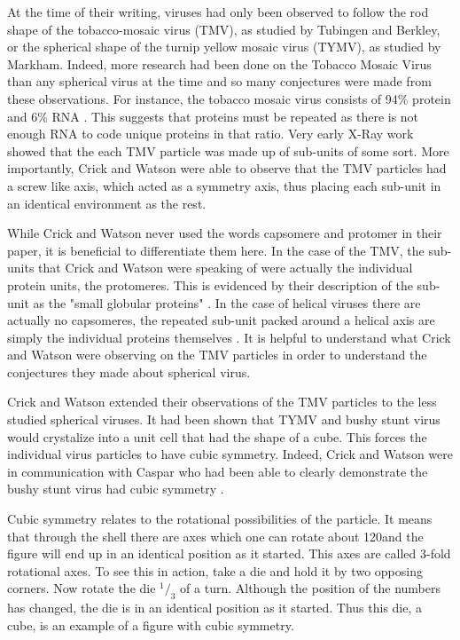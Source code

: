 \documentclass[12pt,letter]{article}
\newcommand*\rfrac[2]{{}^{#1}\!/_{#2}}
\begin{document}
At the time of their writing, viruses had only been observed to follow the rod shape of the tobacco-mosaic virus (TMV), as studied by Tubingen and Berkley, or the spherical shape of the turnip yellow mosaic virus (TYMV), as studied by Markham. Indeed, more research had been done on the Tobacco Mosaic Virus than any spherical virus at the time and so many conjectures were made from these observations. For instance, the tobacco mosaic virus consists of 94\% protein and 6\% RNA \cite[p 473]{Crick:1956}. This suggests that proteins must be repeated as there is not enough RNA to code unique proteins in that ratio. Very early X-Ray work showed that the each TMV particle was made up of sub-units of some sort. More importantly, Crick and Watson were able to observe that the TMV particles had a screw like axis, which acted as a symmetry axis, thus placing each sub-unit in an identical environment as the rest.

While Crick and Watson never used the words capsomere and protomer in their paper, it is beneficial to differentiate them here. In the case of the TMV, the sub-units that Crick and Watson were speaking of were actually the individual protein units, the protomeres. This is evidenced by their description of the sub-unit as the "small globular proteins" \cite[p 473]{Crick:1956}. In the case of helical viruses there are actually no capsomeres, the repeated sub-unit packed around a helical axis are simply the individual proteins themselves \cite[p 474]{Crick:1956}. It is helpful to understand what Crick and Watson were observing on the TMV particles in order to understand the conjectures they made about spherical virus.

Crick and Watson extended their observations of the TMV particles to the less studied spherical viruses. It had been shown that TYMV and bushy stunt virus would crystalize into a unit cell that had the shape of a cube. This forces the individual virus particles to have cubic symmetry. Indeed, Crick and Watson were in communication with Caspar who had been able to clearly demonstrate the bushy stunt virus had cubic symmetry \cite[p 474]{Crick:1956}. 

Cubic symmetry relates to the rotational possibilities of the particle. It means that through the shell there are axes which one can rotate about 120\degree and the figure will end up in an identical position as it started. This axes are called 3-fold rotational axes. To see this in action, take a die and hold it by two opposing corners. Now rotate the die $\rfrac{1}{3}$ of a turn. Although the position of the numbers has changed, the die is in an identical position as it started. Thus this die, a cube, is an example of a figure with cubic symmetry.
\end{document}
